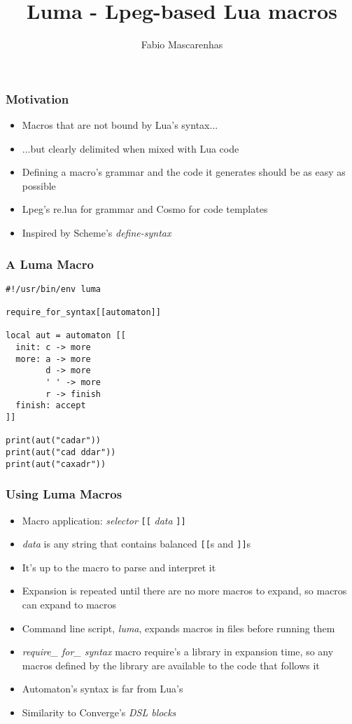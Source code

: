\documentclass{beamer}
\title{Luma - Lpeg-based Lua macros}
\author{Fabio Mascarenhas}
\begin{document}
\begin{frame}
\titlepage
\end{frame}

\begin{frame}
\frametitle{Motivation}

\begin{itemize}
\item Macros that are not bound by Lua's syntax...
\item ...but clearly delimited when mixed with Lua code
\item Defining a macro's grammar and the code it generates
should be as easy as possible
\item Lpeg's re.lua for grammar and Cosmo for code templates
\item Inspired by Scheme's \emph{define-syntax}
\end{itemize}

\end{frame}

\begin{frame}[fragile]
\frametitle{A Luma Macro}

\begin{verbatim}
#!/usr/bin/env luma

require_for_syntax[[automaton]]

local aut = automaton [[
  init: c -> more
  more: a -> more
        d -> more
        ' ' -> more
        r -> finish
  finish: accept
]]

print(aut("cadar"))
print(aut("cad ddar"))
print(aut("caxadr"))

\end{verbatim}

\end{frame}

\begin{frame}[fragile]
\frametitle{Using Luma Macros}

\begin{itemize}
\item Macro application: \emph{selector} \verb|[[| \emph{data} \verb|]]|
\item \emph{data} is any string that contains balanced \verb|[[|s and \verb|]]|s
\item It's up to the macro to parse and interpret it
\item Expansion is repeated until there are no more macros to expand, so
macros can expand to macros
\item Command line script, \emph{luma}, expands macros in files before running them
\item \emph{require\_ for\_ syntax} macro require's a library in expansion time, so any
macros defined by the library are available to the code that follows it
\item Automaton's syntax is far from Lua's
\item Similarity to Converge's \emph{DSL blocks}
\end{itemize}

\end{frame}
\end{document}
